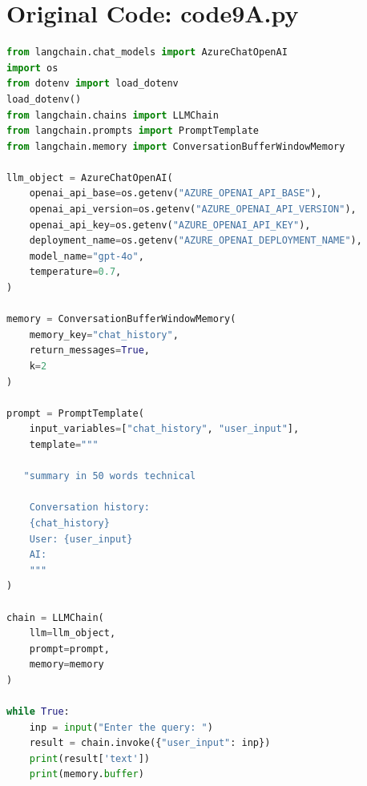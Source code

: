 \documentclass[11pt, a4paper]{article}
\begin{document}
\section{Original Code: code9A.py}
\begin{lstlisting}[language=Python]
from langchain.chat_models import AzureChatOpenAI
import os
from dotenv import load_dotenv
load_dotenv()
from langchain.chains import LLMChain
from langchain.prompts import PromptTemplate
from langchain.memory import ConversationBufferWindowMemory

llm_object = AzureChatOpenAI(
    openai_api_base=os.getenv("AZURE_OPENAI_API_BASE"),
    openai_api_version=os.getenv("AZURE_OPENAI_API_VERSION"),
    openai_api_key=os.getenv("AZURE_OPENAI_API_KEY"),
    deployment_name=os.getenv("AZURE_OPENAI_DEPLOYMENT_NAME"),
    model_name="gpt-4o",
    temperature=0.7,
)

memory = ConversationBufferWindowMemory(
    memory_key="chat_history",
    return_messages=True,
    k=2
)

prompt = PromptTemplate(
    input_variables=["chat_history", "user_input"],
    template="""

   "summary in 50 words technical

    Conversation history:
    {chat_history}
    User: {user_input}
    AI:
    """
)

chain = LLMChain(
    llm=llm_object,
    prompt=prompt,
    memory=memory
)

while True:
    inp = input("Enter the query: ")
    result = chain.invoke({"user_input": inp})
    print(result['text'])
    print(memory.buffer)
\end{lstlisting}
\end{document}
